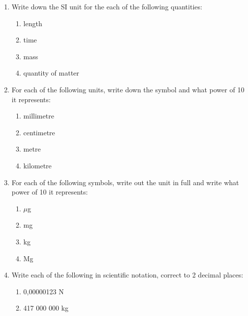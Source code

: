       \label{m30853*id68082}\begin{enumerate}[noitemsep, label=\textbf{\arabic*}. ] 
            \label{m30853*uid63}\item Write down the SI unit for the each of the following quantities:
\label{m30853*id68098}\begin{enumerate}[noitemsep, label=\textbf{\alph*}. ] 
            \label{m30853*uid64}\item length
\label{m30853*uid65}\item time
\label{m30853*uid66}\item mass
\label{m30853*uid67}\item quantity of matter
\end{enumerate}
                \label{m30853*uid68}\item For each of the following units, write down the symbol and what power of 10 it represents:
\label{m30853*id68163}\begin{enumerate}[noitemsep, label=\textbf{\alph*}. ] 
            \label{m30853*uid69}\item millimetre
\label{m30853*uid70}\item centimetre
\label{m30853*uid71}\item metre
\label{m30853*uid72}\item kilometre
\end{enumerate}
                \label{m30853*uid73}\item For each of the following symbols, write out the unit in full and write what power of 10 it represents:
\label{m30853*id68229}\begin{enumerate}[noitemsep, label=\textbf{\alph*}. ] 
            \label{m30853*uid74}\item \begin{math}\mu \end{math}g
\label{m30853*uid75}\item mg
\label{m30853*uid76}\item kg
\label{m30853*uid77}\item Mg
\end{enumerate}
                \label{m30853*uid78}\item Write each of the following in scientific notation, correct to 2 decimal places:
\label{m30853*id68302}\begin{enumerate}[noitemsep, label=\textbf{\alph*}. ] 
            \label{m30853*uid79}\item 0,00000123 N
\label{m30853*uid80}\item 417 000 000 kg

\end{enumerate}
\end{enumerate}
